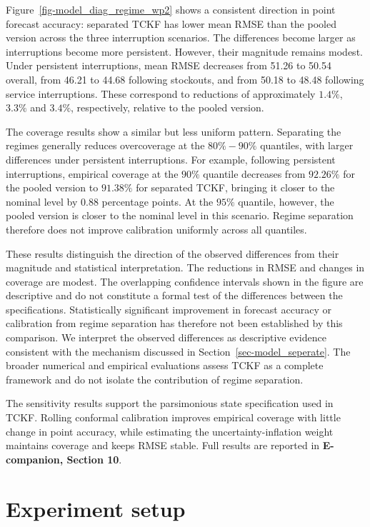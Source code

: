 \documentclass[
  11pt,
  authoryear,
  doubleblind,
  3p]{elsarticle}
\begin{document}
Figure~\ref{fig-model_diag_regime_wp2} shows a consistent direction in
point forecast accuracy: separated TCKF has lower mean RMSE than the
pooled version across the three interruption scenarios. The differences
become larger as interruptions become more persistent. However, their
magnitude remains modest. Under persistent interruptions, mean RMSE
decreases from 51.26 to 50.54 overall, from 46.21 to 44.68 following
stockouts, and from 50.18 to 48.48 following service interruptions.
These correspond to reductions of approximately \(1.4\%\), \(3.3\%\) and
\(3.4\%\), respectively, relative to the pooled version.

The coverage results show a similar but less uniform pattern. Separating
the regimes generally reduces overcoverage at the \(80\%-90\%\)
quantiles, with larger differences under persistent interruptions. For
example, following persistent interruptions, empirical coverage at the
\(90\%\) quantile decreases from \(92.26\%\) for the pooled version to
\(91.38\%\) for separated TCKF, bringing it closer to the nominal level
by 0.88 percentage points. At the \(95\%\) quantile, however, the pooled
version is closer to the nominal level in this scenario. Regime
separation therefore does not improve calibration uniformly across all
quantiles.

These results distinguish the direction of the observed differences from
their magnitude and statistical interpretation. The reductions in RMSE
and changes in coverage are modest. The overlapping confidence intervals
shown in the figure are descriptive and do not constitute a formal test
of the differences between the specifications. Statistically significant
improvement in forecast accuracy or calibration from regime separation
has therefore not been established by this comparison. We interpret the
observed differences as descriptive evidence consistent with the
mechanism discussed in Section~\ref{sec-model_seperate}. The broader
numerical and empirical evaluations assess TCKF as a complete framework
and do not isolate the contribution of regime separation.

The sensitivity results support the parsimonious state specification
used in TCKF. Rolling conformal calibration improves empirical coverage
with little change in point accuracy, while estimating the
uncertainty-inflation weight maintains coverage and keeps RMSE stable.
Full results are reported in \textbf{E-companion, Section 10}.

\section{Experiment setup}\label{sec-experiment_wp2}
\end{document}
